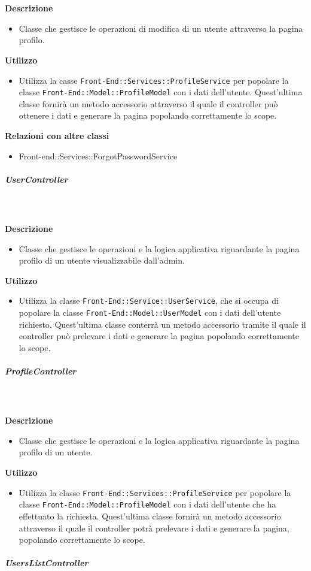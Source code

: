 				\textbf{\\ \\ Descrizione} 
					\begin{itemize}
						\item[] Classe che gestisce le operazioni di modifica di un utente attraverso la pagina profilo.
					\end{itemize}      
				\textbf{Utilizzo}  
					\begin{itemize}
						\item[] Utilizza la casse \texttt{Front-End::Services::ProfileService} per popolare la classe \texttt{Front-End::Model::ProfileModel} con i dati dell'utente. Quest'ultima classe fornirà un metodo accessorio attraverso il quale il controller può ottenere i dati e generare la pagina popolando correttamente lo scope.
					\end{itemize}
					\textbf{Relazioni con altre classi}
					\begin{itemize}
							\item{Front-end::Services::ForgotPasswordService}
					\end{itemize}
			\subparagraph{UserController}
				
				\textbf{\\ \\ Descrizione} 
					\begin{itemize}
						\item[] Classe che gestisce le operazioni e la logica applicativa riguardante la pagina profilo di un utente visualizzabile dall'admin.
					\end{itemize}      
				\textbf{Utilizzo}  
					\begin{itemize}
						\item[] Utilizza la classe \texttt{Front-End::Service::UserService}, che si occupa di popolare la classe \texttt{Front-End::Model::UserModel} con i dati dell'utente richiesto. Quest'ultima classe conterrà un metodo accessorio tramite il quale il controller può prelevare i dati e generare la pagina popolando correttamente lo scope.
					\end{itemize}
			\subparagraph{ProfileController}
				
				\textbf{\\ \\ Descrizione} 
					\begin{itemize}
						\item[] Classe che gestisce le operazioni e la logica applicativa riguardante la pagina profilo di un utente.
					\end{itemize}      
				\textbf{Utilizzo}  
					\begin{itemize}
						\item[] Utilizza la classe \texttt{Front-End::Services::ProfileService} per popolare la classe \texttt{Front-End::Model::ProfileModel} con i dati dell'utente che ha effettuato la richiesta. Quest'ultima classe fornirà un metodo accessorio attraverso il quale il controller potrà prelevare i dati e generare la pagina, popolando correttamente lo scope.
					\end{itemize}
			\subparagraph{UsersListController}
				
